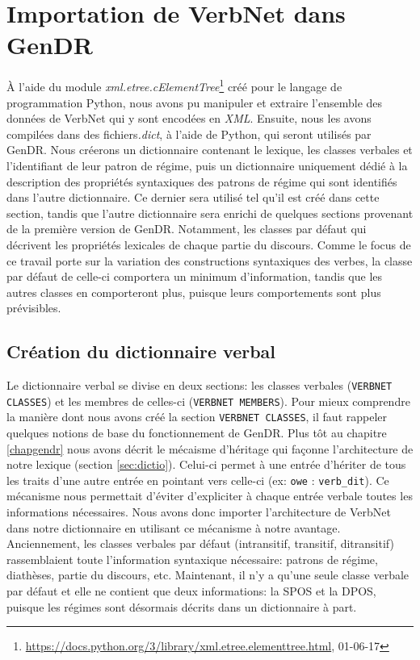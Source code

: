 \chapter{Importation de VerbNet dans GenDR}\label{ch:python}


À l'aide du module \emph{xml.etree.cElementTree}\footnote{\url{https://docs.python.org/3/library/xml.etree.elementtree.html}, 01-06-17} créé pour le langage de programmation Python, nous avons pu manipuler et extraire l'ensemble des données de VerbNet qui y sont encodées en \emph{XML}. Ensuite, nous les avons compilées dans des fichiers\emph{.dict}, à l'aide de Python, qui seront utilisés par GenDR. Nous créerons un dictionnaire contenant le lexique, les classes verbales et l'identifiant de leur patron de régime, puis un dictionnaire uniquement dédié à la description des propriétés syntaxiques des patrons de régime qui sont identifiés dans l'autre dictionnaire. Ce dernier sera utilisé tel qu'il est créé dans cette section, tandis que l'autre dictionnaire sera enrichi de quelques sections provenant de la première version de GenDR. Notamment, les classes par défaut qui décrivent les propriétés lexicales de chaque partie du discours. Comme le focus de ce travail porte sur la variation des constructions syntaxiques des verbes, la classe par défaut de celle-ci comportera un minimum d'information, tandis que les autres classes en comporteront plus, puisque leurs comportements sont plus prévisibles.
 
\section{Création du dictionnaire verbal}

Le dictionnaire verbal se divise en deux sections: les classes verbales (\texttt{VERBNET CLASSES}) et les membres de celles-ci (\texttt{VERBNET MEMBERS}). Pour mieux comprendre la manière dont nous avons créé la section \texttt{VERBNET CLASSES}, il faut rappeler quelques notions de base du fonctionnement de GenDR. Plus tôt au chapitre \ref{chapgendr} nous avons décrit le mécaisme d'héritage qui façonne l'architecture de notre lexique (section \ref{sec:dictio}). Celui-ci permet à une entrée d'hériter de tous les traits d'une autre entrée en pointant vers celle-ci (ex: \texttt{owe} : \texttt{verb\_dit}). Ce mécanisme nous permettait d'éviter d'expliciter à chaque entrée verbale toutes les informations nécessaires. Nous avons donc importer l'architecture de VerbNet dans notre dictionnaire en utilisant ce mécanisme à notre avantage. Anciennement, les classes verbales par défaut (intransitif, transitif, ditransitif) rassemblaient toute l'information syntaxique nécessaire: patrons de régime, diathèses, partie du discours, etc. Maintenant, il n'y a qu'une seule classe verbale par défaut et elle ne contient que deux informations: la \ac{SPOS} et la \ac{DPOS}, puisque les régimes sont désormais décrits dans un dictionnaire à part.

